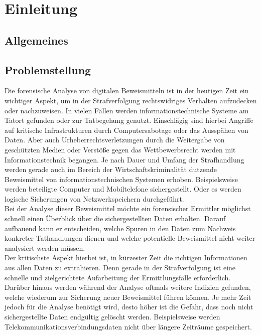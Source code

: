 
\chapter{Einleitung}
\label{ch:einleitung}
\section{Allgemeines}

\section{Problemstellung}
Die forensische Analyse von digitalen Beweismitteln ist in der heutigen Zeit ein wichtiger Aspekt, um in der Strafverfolgung rechtswidriges Verhalten aufzudecken oder nachzuweisen. In vielen Fällen werden informationstechnische Systeme am Tatort gefunden oder zur Tatbegehung genutzt. Einschlägig sind hierbei Angriffe auf kritische Infrastrukturen durch Computersabotage oder das Ausspähen von Daten. Aber auch Urheberrechtsverletzungen durch die Weitergabe von geschützten Medien oder Verstöße gegen das Wettbewerbsrecht werden mit Informationstechnik begangen.
Je nach Dauer und Umfang der Strafhandlung werden gerade auch im Bereich der Wirtschaftskriminalität dutzende Beweismittel von informationstechnischen Systemen erhoben. Beispielsweise werden beteiligte Computer und Mobiltelefone sichergestellt. Oder es werden logische Sicherungen von Netzwerkspeichern durchgeführt.\\

\noindent
Bei der Analyse dieser Beweismittel möchte ein forensischer Ermittler möglichst schnell einen Überblick über die sichergestellten Daten erhalten. Darauf aufbauend kann er entscheiden, welche Spuren in den Daten zum Nachweis konkreter Tathandlungen dienen und welche potentielle Beweismittel nicht weiter analysiert werden müssen.\\

\noindent
Der kritischste Aspekt hierbei ist, in kürzester Zeit die richtigen Informationen aus allen Daten zu extrahieren. Denn gerade in der Strafverfolgung ist eine schnelle und zielgerichtete Aufarbeitung der Ermittlungsfälle erforderlich. Darüber hinaus werden während der Analyse oftmals weitere Indizien gefunden, welche wiederum zur Sicherung neuer Beweismittel führen können. Je mehr Zeit jedoch für die Analyse benötigt wird, desto höher ist die Gefahr, dass noch nicht sichergestellte Daten endgültig gelöscht werden. Beispielsweise werden Telekommunikationsverbindungsdaten nicht über längere Zeiträume gespeichert.\\

